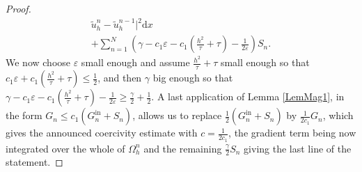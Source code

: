 \documentclass[10pt,a4paper]{amsart}
\newcommand{\dx}{\mathrm{d}x}
\begin{document}
\begin{proof}
\begin{multline*}
	\tilde{u}_h^n - \tilde{u}_h^{n - 1} |^2 \dx \\
	+ \sum_{n = 1}^N \left( \gamma -c_1\varepsilon - c_1\left(\frac{h^2}{\tau}+\tau\right) - \frac{1}{2 \varepsilon} \right) S_n .
\end{multline*}
    We now choose $\varepsilon$ small enough and assume $\frac{h^2}{\tau}+\tau$ small enough so that $c_1\varepsilon+c_1\left(\frac{h^2}{\tau}+\tau\right)\leqslant \frac12$, and then $\gamma$ big enough so that $\gamma-c_1\varepsilon-c_1\left(\frac{h^2}{\tau}+\tau\right)-\frac{1}{2\varepsilon}\geqslant \frac{\gamma}{2}+\frac12$. A last application of Lemma \ref{LemMag1}, in the form $G_n \leqslant c_1 (G_n^{\mathrm{in}} + S_n)$, allows us to replace $\frac12 (G_n^{\mathrm{in}} + S_n)$ by $\frac{1}{2c_1} G_n$, which gives the announced coercivity estimate with $c=\frac{1}{2c_1}$, the gradient term being now integrated over the whole of $\Omega_h^n$ and the remaining $\frac{\gamma}{2}S_n$ giving the last line of the statement.
\end{proof}
\end{document}
